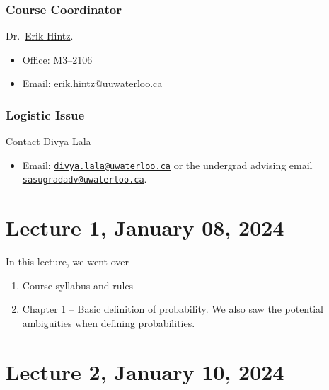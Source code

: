 \documentclass[
]{book}
\providecommand{\tightlist}{%
  \setlength{\itemsep}{0pt}\setlength{\parskip}{0pt}}
\theoremstyle{definition}
\theoremstyle{definition}
\theoremstyle{definition}
\theoremstyle{definition}
\theoremstyle{remark}
\begin{document}
\hypertarget{course-coordinator}{%
\subsection{Course Coordinator}\label{course-coordinator}}

Dr.~\href{https://uwaterloo.ca/scholar/ehintz}{Erik Hintz}.

\begin{itemize}
\tightlist
\item
  Office: M3--2106
\item
  Email: \href{mailto:erik.hintz@uwaterloo.ca}{erik.hintz@uuwaterloo.ca}
\end{itemize}

\hypertarget{logistic-issue}{%
\subsection{Logistic Issue}\label{logistic-issue}}

Contact Divya Lala

\begin{itemize}
\tightlist
\item
  Email: \href{mailto:divya.lala@uwaterloo.ca}{\nolinkurl{divya.lala@uwaterloo.ca}} or the undergrad advising email \href{mailto:sasugradadv@uwaterloo.ca}{\nolinkurl{sasugradadv@uwaterloo.ca}}.
\end{itemize}

\hypertarget{lecture-1-january-08-2024}{%
\chapter{Lecture 1, January 08, 2024}\label{lecture-1-january-08-2024}}

In this lecture, we went over

\begin{enumerate}
\def\labelenumi{\arabic{enumi}.}
\tightlist
\item
  Course syllabus and rules
\item
  Chapter 1 -- Basic definition of probability. We also saw the potential ambiguities when defining probabilities.
\end{enumerate}

\hypertarget{lecture-2-january-10-2024}{%
\chapter{Lecture 2, January 10, 2024}\label{lecture-2-january-10-2024}}
\end{document}

